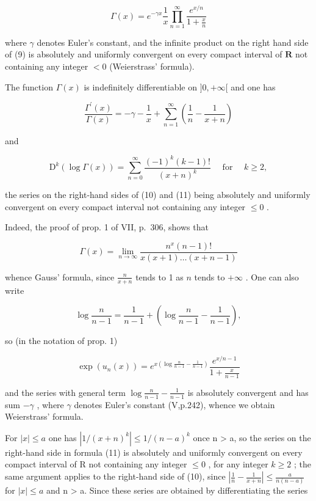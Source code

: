 \[
\Gamma (x) = e ^ {- \gamma x} \frac {1}{x} \prod_ {n = 1} ^ {\infty} \frac {e ^ {x / n}}{1 + \frac {x}{n}}\tag{9}
\]

where \(\gamma\) denotes Euler's constant, and the infinite product on the right hand side of (9) is absolutely and uniformly convergent on every compact interval of \(\mathbf{R}\) not containing any integer \(< 0\) (Weierstrass' formula).

The function \(\Gamma(x)\) is indefinitely differentiable on \(]0, +\infty[\) and one has

\[
{\frac {\Gamma^ {\prime} (x)}{\Gamma (x)}} = - \gamma - {\frac {1}{x}} + \sum_ {n = 1} ^ {\infty} \left({\frac {1}{n}} - {\frac {1}{x + n}}\right)\tag{10}
\]

and

\[
\mathrm{D} ^ {k} (\log \Gamma (x)) = \sum_ {n = 0} ^ {\infty} \frac {(- 1) ^ {k} (k - 1) !}{(x + n) ^ {k}} \quad \text { for } \quad k \geqslant 2,\tag{11}
\]

the series on the right-hand sides of (10) and (11) being absolutely and uniformly convergent on every compact interval not containing any integer \(\leqslant 0\) .

Indeed, the proof of prop. 1 of VII, p.~306, shows that

\[
\Gamma (x) = \lim _ {n \rightarrow \infty} \frac {n ^ {x} (n - 1) !}{x (x + 1) \dots (x + n - 1)}
\]

whence Gauss' formula, since \(\frac{n}{x + n}\) tends to 1 as \(n\) tends to \(+\infty\) . One can also write

\[
\log \frac {n}{n - 1} = \frac {1}{n - 1} + \left(\log \frac {n}{n - 1} - \frac {1}{n - 1}\right),
\]

so (in the notation of prop. 1)

\[
\exp (u _ {n} (x)) = e ^ {x \left(\log \frac {n}{n - 1} - \frac {1}{n - 1}\right)} \frac {e ^ {x / n - 1}}{1 + \frac {x}{n - 1}}
\]

and the series with general term \(\log \frac{n}{n - 1} -\frac{1}{n - 1}\) is absolutely convergent and has sum \(-\gamma\) , where \(\gamma\) denotes Euler's constant (V,p.242), whence we obtain Weierstrass' formula.

For \(|x| \leqslant a\) one has \(\left|1/(x+n)^{k}\right| \leqslant 1/(n-a)^{k}\) once n \textgreater{} a, so the series on the right-hand side in formula (11) is absolutely and uniformly convergent on every compact interval of R not containing any integer \(\leqslant 0\) , for any integer \(k \geqslant 2\) ; the same argument applies to the right-hand side of (10), since \(\left|\frac{1}{n}-\frac{1}{x+n}\right| \leqslant \frac{a}{n(n-a)}\) for \(|x| \leqslant a\) and n \textgreater{} a. Since these series are obtained by differentiating the series

